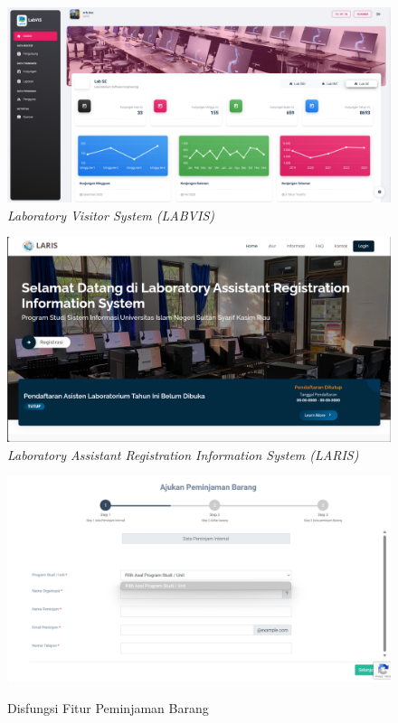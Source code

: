 \begin{figure}
	\centering
	\includegraphics[width=0.82\linewidth]{konten//gambar/labvis.png}
	\caption{\textit{Laboratory Visitor System (LABVIS)} \protect\cite{web-prodi}}
	\label{fig:enter-label}
\end{figure}

\begin{figure}
	\centering
	\includegraphics[width=0.82\linewidth]{konten//gambar/laris.png}
	\caption{\textit{Laboratory Assistant Registration Information System (LARIS)} \protect\cite{web-prodi}}
	\label{fig:enter-label}
\end{figure}

\begin{figure}
	\centering
	\includegraphics[width=0.82\linewidth]{konten//gambar/observasi-peminjaman-barang.png}
	\caption{Disfungsi Fitur Peminjaman Barang} \protect\cite{sitaris}
	\label{fig:enter-label}
\end{figure}

